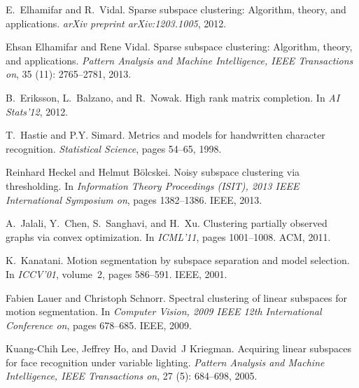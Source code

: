 \documentclass{ctexart}
\begin{document}
\begin{thebibliography}{47}
    E.~Elhamifar and R.~Vidal.
    \newblock Sparse subspace clustering: Algorithm, theory, and applications.
    \newblock \emph{arXiv preprint arXiv:1203.1005}, 2012.

    Ehsan Elhamifar and Rene Vidal.
    \newblock Sparse subspace clustering: Algorithm, theory, and applications.
    \newblock \emph{Pattern Analysis and Machine Intelligence, IEEE Transactions
    on}, 35 (11): 2765--2781, 2013.

    B.~Eriksson, L.~Balzano, and R.~Nowak.
    \newblock High rank matrix completion.
    \newblock In \emph{AI Stats'12}, 2012.

    T.~Hastie and P.Y. Simard.
    \newblock Metrics and models for handwritten character recognition.
    \newblock \emph{Statistical Science}, pages 54--65, 1998.

    Reinhard Heckel and Helmut B{\"o}lcskei.
    \newblock Noisy subspace clustering via thresholding.
    \newblock In \emph{Information Theory Proceedings (ISIT), 2013 IEEE
    International Symposium on}, pages 1382--1386. IEEE, 2013.

    A.~Jalali, Y.~Chen, S.~Sanghavi, and H.~Xu.
    \newblock Clustering partially observed graphs via convex optimization.
    \newblock In \emph{ICML'11}, pages 1001--1008. ACM, 2011.

    K.~Kanatani.
    \newblock Motion segmentation by subspace separation and model selection.
    \newblock In \emph{ICCV'01}, volume~2, pages 586--591. IEEE, 2001.

    Fabien Lauer and Christoph Schnorr.
    \newblock Spectral clustering of linear subspaces for motion segmentation.
    \newblock In \emph{Computer Vision, 2009 IEEE 12th International Conference
    on}, pages 678--685. IEEE, 2009.

    Kuang-Chih Lee, Jeffrey Ho, and David~J Kriegman.
    \newblock Acquiring linear subspaces for face recognition under variable
    lighting.
    \newblock \emph{Pattern Analysis and Machine Intelligence, IEEE Transactions
    on}, 27 (5): 684--698, 2005.


\end{thebibliography}
\end{document}
